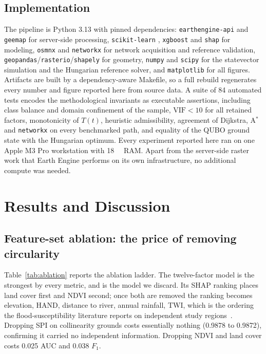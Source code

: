 \documentclass[10pt,twocolumn]{article}
\newcommand{\Tt}{T(t)}
\begin{document}
\subsection{Implementation}
The pipeline is Python 3.13 with pinned dependencies: \texttt{earthengine-api}
and \texttt{geemap} for server-side processing, \texttt{scikit-learn}
\citep{pedregosa2011}, \texttt{xgboost} \citep{chen2016} and \texttt{shap}
\citep{lundberg2017} for modeling, \texttt{osmnx} \citep{boeing2017} and
\texttt{networkx} for network acquisition and reference validation,
\texttt{geopandas}/\texttt{rasterio}/\texttt{shapely} for geometry,
\texttt{numpy} \citep{harris2020} and \texttt{scipy} \citep{virtanen2020} for the
statevector simulation and the Hungarian reference solver, and
\texttt{matplotlib} \citep{hunter2007} for all figures. Artifacts are built
by a dependency-aware Makefile, so a full rebuild regenerates every number and
figure reported here from source data. A suite of 84 automated tests encodes the
methodological invariants as executable assertions, including class balance and
domain confinement of the sample, $\mathrm{VIF}<10$ for all retained factors,
monotonicity of $\Tt$, heuristic admissibility, agreement of Dijkstra, A$^\ast$
and \texttt{networkx} on every benchmarked path, and equality of the QUBO ground
state with the Hungarian optimum. Every experiment reported here ran on one Apple
M3 Pro workstation with \SI{18}{\giga\byte} RAM. Apart from the server-side
raster work that Earth Engine performs on its own infrastructure, no additional
compute was needed.

\section{Results and Discussion}
\label{sec:results}

\subsection{Feature-set ablation: the price of removing circularity}
\label{sec:res-ablation}

Table~\ref{tab:ablation} reports the ablation ladder. The twelve-factor model is
the strongest by every metric, and is the model we discard. Its SHAP ranking
places land cover first and NDVI second; once both are removed the ranking
becomes elevation, HAND, distance to river, annual rainfall, TWI, which is the
ordering the flood-susceptibility literature reports on independent study
regions~\citep{arabameri2019,saha2021,aydin2022}. Dropping SPI on collinearity
grounds costs essentially nothing (0.9878 to 0.9872), confirming it carried no
independent information. Dropping NDVI and land cover costs 0.025 AUC and 0.038
$F_1$.
\end{document}
